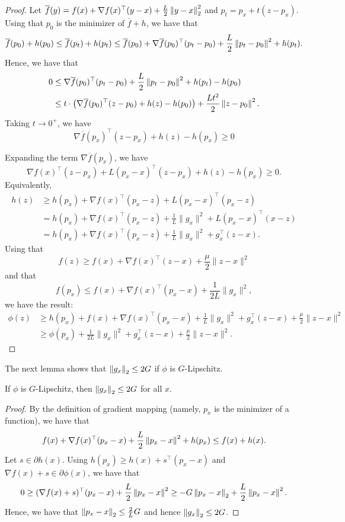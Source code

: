 \begin{proof}
Let $\overline{f}(y)=f(x)+\nabla f(x)^{\top}(y-x)+\frac{L}{2}\left\Vert y-x\right\Vert^{2}_{2}$
and $p_{t}=p_{x}+t(z-p_{x})$. Using that $p_{0}$ is the minimizer
of $\overline{f}+h$, we have that 
\[
\overline{f}(p_{0})+h(p_{0})\leq\overline{f}(p_{t})+h(p_{t})\leq\overline{f}(p_{0})+\nabla\overline{f}(p_{0})^{\top}(p_{t}-p_{0})+\frac{L}{2}\left\Vert p_{t}-p_{0}\right\Vert^{2}+h(p_{t}).
\]
Hence, we have that
\begin{align*}
0 & \leq\nabla\overline{f}(p_{0})^{\top}(p_{t}-p_{0})+\frac{L}{2}\left\Vert p_{t}-p_{0}\right\Vert^{2}+h(p_{t})-h(p_{0})\\
 & \leq t\cdot\left(\nabla\overline{f}(p_{0})^{\top}(z-p_{0})+h(z)-h(p_{0})\right)+\frac{Lt^{2}}{2}\left\Vert z-p_{0}\right\Vert^{2}.
\end{align*}
Taking $t\rightarrow0^{+}$, we have 
\[
\nabla\overline{f}(p_{x})^{\top}(z-p_{x})+h(z)-h(p_{x})\geq0
\]

Expanding the term $\nabla\overline{f}(p_{x})$, we have
\[
\nabla f(x)^{\top}(z-p_{x})+L(p_{x}-x)^{\top}(z-p_{x})+h(z)-h(p_{x})\geq0.
\]
Equivalently,
\begin{align*}
h(z) & \geq h(p_{x})+\nabla f(x)^{\top}(p_{x}-z)+L(p_{x}-x)^{\top}(p_{x}-z)\\
 & =h(p_{x})+\nabla f(x)^{\top}(p_{x}-z)+\frac{1}{L}\|g_{x}\|^{2}+L(p_{x}-x)^{\top}(x-z)\\
 & =h(p_{x})+\nabla f(x)^{\top}(p_{x}-z)+\frac{1}{L}\|g_{x}\|^{2}+g^{\top}_{x}(z-x).
\end{align*}
Using that 
\[
f(z)\geq f(x)+\nabla f(x)^{\top}(z-x)+\frac{\mu}{2}\|z-x\|^{2}
\]
and that
\[
f(p_{x})\leq f(x)+\nabla f(x)^{\top}(p_{x}-x)+\frac{1}{2L}\|g_{x}\|^{2},
\]
we have the result:
\begin{align*}
\phi(z) & \geq h(p_{x})+f(x)+\nabla f(x)^{\top}(p_{x}-x)+\frac{1}{L}\|g_{x}\|^{2}+g^{\top}_{x}(z-x)+\frac{\mu}{2}\|z-x\|^{2}\\
 & \geq\phi(p_{x})+\frac{1}{2L}\|g_{x}\|^{2}+g^{\top}_{x}(z-x)+\frac{\mu}{2}\|z-x\|^{2}.
\end{align*}

\end{proof}
The next lemma shows that $\left\Vert g_{x}\right\Vert_{2}\leq2G$ if $\phi$ is
$G$-Lipschitz.
\begin{lem}
\label{lem:Lipschitz_constant_g}If $\phi$ is $G$-Lipschitz, then
$\left\Vert g_{x}\right\Vert_{2}\leq2G$ for all $x$.
\end{lem}

\begin{proof}
By the definition of gradient mapping (namely, $p_{x}$ is the minimizer
of a function), we have that
\[
f(x)+\nabla f(x)^{\top}(p_{x}-x)+\frac{L}{2}\left\Vert p_{x}-x\right\Vert^{2}+h(p_{x})\leq f(x)+h(x).
\]
Let $s\in\partial h(x)$. Using $h(p_{x})\geq h(x)+s^{\top}(p_{x}-x)$
and $\nabla f(x)+s\in\partial\phi(x)$, we have that
\[
0\geq(\nabla f(x)+s)^{\top}(p_{x}-x)+\frac{L}{2}\left\Vert p_{x}-x\right\Vert^{2}\geq-G\left\Vert p_{x}-x\right\Vert_{2}+\frac{L}{2}\left\Vert p_{x}-x\right\Vert^{2}.
\]
Hence, we have that $\left\Vert p_{x}-x\right\Vert_{2}\leq\frac{2}{L}G$ and hence
$\left\Vert g_{x}\right\Vert_{2}\leq2G$.
\end{proof}

